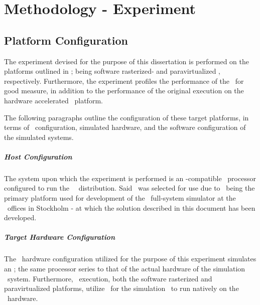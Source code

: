 
\chapter{Methodology - Experiment}
\label{cha:methodologyexperiment}

\section{Platform Configuration}
\label{sec:methodologyexperiment_platformconfiguration}
The experiment devised for the purpose of this dissertation is performed on the platforms outlined in ; being software rasterized- and paravirtualized \dvttermsimics , respectively.
Furthermore, the experiment profiles the performance of the \dvttermreferencesolution\ for good measure, in addition to the performance of the original execution on the hardware accelerated \dvttermhost\ platform. %

The following paragraphs outline the configuration of these target platforms, in terms of \dvttermhost\ configuration, simulated hardware, and the software configuration of the simulated systems.

\paragraph{Host Configuration}
\label{par:methodologyexperiment_platformconfiguration_hostconfiguration}
The system upon which the experiment is performed is an \dvttermxeightysix -compatible \dvttermintel\ processor configured to run the \dvttermfedora\ \dvttermlinux\ distribution.
Said \dvttermos\ was selected for use due to \dvttermfedora\ being the primary platform used for development of the \dvttermsimics\ full-system simulator at the \dvttermintel\ offices in Stockholm - at which the solution described in this document has been developed.


\paragraph{Target Hardware Configuration}
\label{par:methodologyexperiment_platformconfiguration:targethardwareconfiguration}
The \dvttermsimics\ hardware configuration utilized for the purpose of this experiment simulates an \dvttermintelcoreiseven ; the same processor series to that of the actual hardware of the simulation \dvttermhost\ system.
Furthermore, \dvttermsimics\ execution, both the software rasterized and paravirtualized platforms, utilize \dvttermkvm\ for the simulation \dvttermtarget\ to run natively on the \dvttermhost\ hardware.

